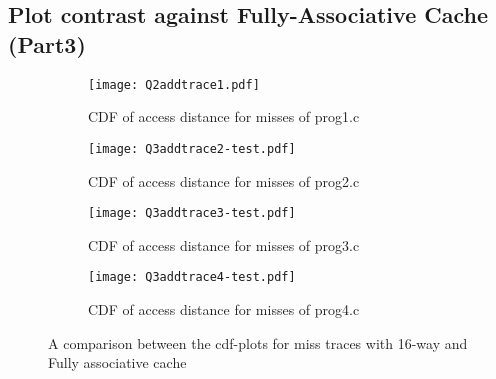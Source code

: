 \subsection{Plot contrast against Fully-Associative Cache (Part3)}
\begin{figure}[H]
\centering
\begin{subfigure}{.48\textwidth}
  \centering
  \texttt{[image: Q2addtrace1.pdf]}
  \caption{CDF of access distance for misses of prog1.c}
  \label{fig:sub1}
\end{subfigure}%
\hspace{2mm}
\begin{subfigure}{.465\textwidth}
  \centering
  \texttt{[image: Q3addtrace2-test.pdf]}
  \caption{CDF of access distance for misses of prog2.c}
  \label{fig:sub2}
\end{subfigure}
\label{fig:test1}
\vspace{0.8in}
\begin{subfigure}{.48\textwidth}
  \centering
  \texttt{[image: Q3addtrace3-test.pdf]}
  \caption{CDF of access distance for misses of prog3.c}
  \label{fig:sub3}
\end{subfigure}%
\hspace{2mm}
\begin{subfigure}{.465\textwidth}
  \centering
  \texttt{[image: Q3addtrace4-test.pdf]}
  \caption{CDF of access distance for misses of prog4.c}
  \label{fig:sub4}
\end{subfigure}
\caption{A comparison between the cdf-plots for miss traces with 16-way and Fully associative cache}
\label{fig:test2}
\end{figure}